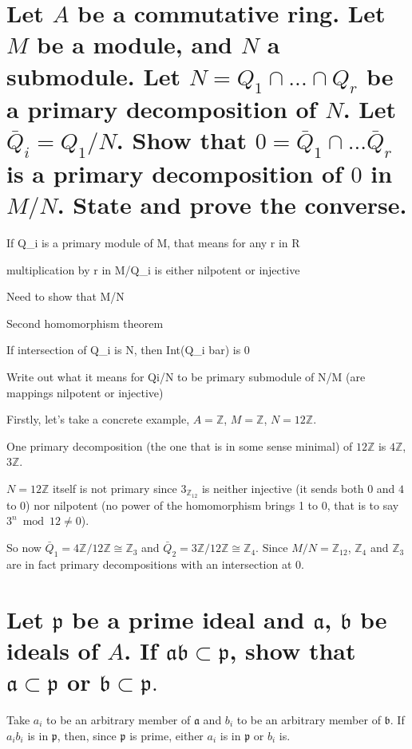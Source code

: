 \documentclass{article}
\begin{document}
\section{Let $A$ be a commutative ring. Let $M$ be a module, and $N$ a submodule. Let $N=Q_1 \cap ... \cap Q_r$ be a primary decomposition of $N$. Let $\bar{Q}_i = Q_1/N$. Show that $0 = \bar{Q}_1 \cap ... \bar{Q}_r$ is a primary decomposition of $0$ in $M/N$. State and prove the converse.}

If Q_i is a primary module of M, that means for any r in R

multiplication by r in M/Q_i is either nilpotent or injective

Need to show that M/N

Second homomorphism theorem 

If intersection of Q_i is N, then Int(Q_i bar) is 0

Write out what it means for Qi/N to be primary submodule of N/M (are mappings nilpotent or injective)


Firstly, let's take a concrete example, $A=\mathbb{Z}$, $M=\mathbb{Z}$, $N=12\mathbb{Z}$.

One primary decomposition (the one that is in some sense minimal) of $12\mathbb{Z}$ is $4\mathbb{Z}$, $3\mathbb{Z}$.

$N=12\mathbb{Z}$ itself is not primary since $3_{\mathbb{Z}_{12}}$ is neither injective (it sends both $0$ and $4$ to 0) nor nilpotent (no power of the homomorphism brings 1 to 0, that is to say $3^n \bmod 12 \ne 0$).

So now $\bar{Q}_1 = 4\mathbb{Z} / 12\mathbb{Z} \cong \mathbb{Z}_3$ and $\bar{Q}_2 = 3\mathbb{Z} / 12\mathbb{Z} \cong \mathbb{Z}_4$. Since $M/N = \mathbb{Z}_12$, $\mathbb{Z}_4$ and $\mathbb{Z}_3$ are in fact primary decompositions with an intersection at $0$. 

\section{Let $\mathfrak{p}$ be a prime ideal and $\mathfrak{a}$, $\mathfrak{b}$ be ideals of $A$. If $\mathfrak{a b} \subset \mathfrak{p}$, show that $\mathfrak{a} \subset \mathfrak{p}$ or $\mathfrak{b} \subset \mathfrak{p}.$}

Take $a_i$ to be an arbitrary member of $\mathfrak{a}$ and $b_i$ to be an arbitrary member of $\mathfrak{b}$. If $a_i b_i$ is in $\mathfrak{p}$, then, since $\mathfrak{p}$ is prime, either $a_i$ is in $\mathfrak{p}$ or $b_i$ is.
\end{document}
